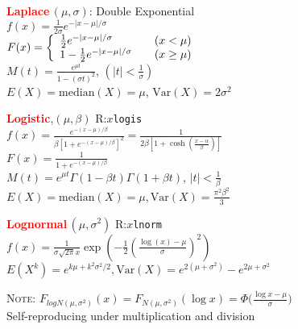 \documentclass[10pt]{article}
\newenvironment{LIST}[1]{\begin{list}{}
                          { \settowidth{\labelwidth}{#1}
                            \setlength{\leftmargin}{\labelwidth}
                            \addtolength{\leftmargin}{\labelsep}
                            \setlength{\parsep}{0.5ex plus0.2ex minus0.2ex}
                            \setlength{\itemsep}{0ex plus0.2ex}
                            \renewcommand{\makelabel}[1]{##1\hfill}
                          }
                        }
                        {\end{list}}
\begin{document}
\begin{multicols}{2}
\begin{small}
\begin{enumerate}
\item \textcolor{red}{\bfseries\textsf{Laplace}}\,$(\mu,\sigma)$: Double Exponential \\
      $f(x) = \frac{1}{2\sigma} e^{-|x-\mu|/\sigma}$ \\
      $F(x) = \left\{ \begin{array}{l@{\qquad}l}
              \frac{1}{2} e^{-|x-\mu|/\sigma} & (x<\mu) \\
            1-\frac{1}{2} e^{-|x-\mu|/\sigma} & (x \ge \mu) \\
                      \end{array} \right.$ \\
      $M(t)=\displaystyle\frac{e^{\mu t}}{1-(\sigma t)^2}$, $(|t|<\frac{1}{\sigma})$ \\
      $E(X) = \mathrm{median}(X) = \mu$, $\textrm{Var}(X)=2\sigma^2$ 

\item \textcolor{red}{\bfseries\textsf{Logistic}},$(\mu,\beta)$ \hfill \textsf{R:}$x$\texttt{\color{red}logis} \\
      $f(x) = \displaystyle\frac{e^{-(x-\mu)/\beta}}{\beta[1+e^{-(x-\mu)/\beta}]^2}
            = \displaystyle\frac{1}{2\beta\left[1+\cosh\left(\frac{x-\alpha}{\beta}\right)\right]}$\\
      $F(x) = \displaystyle\frac{1}{1+e^{-(x-\mu)/\beta}}$\\
      $M(t) = e^{\mu t}\Gamma(1-\beta t) \Gamma(1+\beta t)$, $|t| < \frac{1}{\beta}$\\
      $E(X)=\mathrm{median}(X)=\mu, \textrm{Var}(X)=\frac{\pi^2\beta^2}{3}$

\item \textcolor{red}{\bfseries\textsf{Lognormal}}\,$(\mu,\sigma^2)$ \hfill \textsf{R:}$x$\texttt{\color{red}lnorm} \\
      $f(x)=\frac{\displaystyle 1}{\displaystyle \sigma\sqrt{2\pi}x}
            \exp(-\frac{1}{2}(\frac{\log(x)-\mu}{\sigma})^2)$\\
      $E(X^k)=e^{k\mu+k^2 \sigma^2/2}, \textrm{Var}(X)=e^{2(\mu+\sigma^2)}-e^{2\mu+\sigma^2}$
      \begin{LIST}{\textsc{Note:}}
      \item[\textsc{Note:}]
      $F_{logN(\mu,\sigma^2)}(x)=F_{N(\mu,\sigma^2)}(\log x)
         =\Phi\big( \frac{\log x-\mu}{\sigma} \big)$ \\
      Self-reproducing under multiplication and division
      \end{LIST}


\end{enumerate}
\end{small}
\end{multicols}
\end{document}
